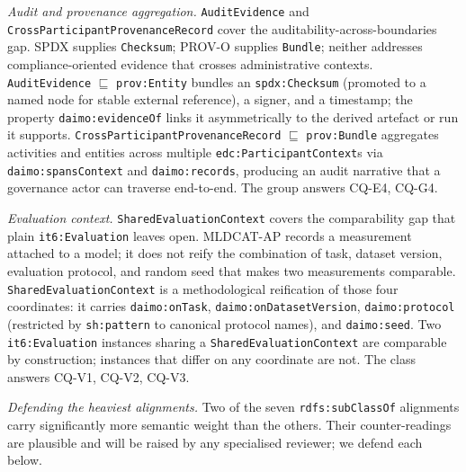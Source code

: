 \documentclass[Afour,sagev,times]{sagej}
\newcommand{\code}[1]{\texttt{#1}}
\begin{document}
\medskip\noindent\emph{Audit and provenance aggregation.}
\code{AuditEvidence} and \code{CrossParticipantProvenanceRecord} cover the auditability-across-boundaries gap. SPDX supplies \code{Checksum}; PROV-O supplies \code{Bundle}; neither addresses compliance-oriented evidence that crosses administrative contexts. \code{AuditEvidence} $\sqsubseteq$ \code{prov:Entity} bundles an \code{spdx:Checksum} (promoted to a named node for stable external reference), a signer, and a timestamp; the property \code{daimo:evidenceOf} links it asymmetrically to the derived artefact or run it supports. \code{CrossParticipantProvenanceRecord} $\sqsubseteq$ \code{prov:Bundle} aggregates activities and entities across multiple \code{edc:ParticipantContext}s via \code{daimo:spansContext} and \code{daimo:records}, producing an audit narrative that a governance actor can traverse end-to-end. The group answers CQ-E4, CQ-G4.

\medskip\noindent\emph{Evaluation context.}
\code{SharedEvaluationContext} covers the comparability gap that plain \code{it6:Evaluation} leaves open. MLDCAT-AP records a measurement attached to a model; it does not reify the combination of task, dataset version, evaluation protocol, and random seed that makes two measurements comparable. \code{SharedEvaluationContext} is a methodological reification of those four coordinates: it carries \code{daimo:onTask}, \code{daimo:onDatasetVersion}, \code{daimo:protocol} (restricted by \code{sh:pattern} to canonical protocol names), and \code{daimo:seed}. Two \code{it6:Evaluation} instances sharing a \code{SharedEvaluationContext} are comparable by construction; instances that differ on any coordinate are not. The class answers CQ-V1, CQ-V2, CQ-V3.

\medskip\noindent\emph{Defending the heaviest alignments.}\label{sec:alignment-defense}
Two of the seven \code{rdfs:subClassOf} alignments carry significantly more semantic weight than the others. Their counter-readings are plausible and will be raised by any specialised reviewer; we defend each below.
\end{document}
